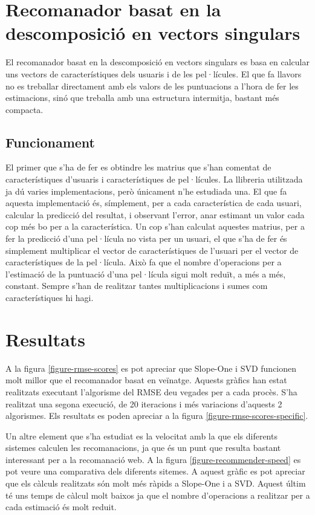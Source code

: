 \section{Recomanador basat en la descomposició en vectors singulars}

El recomanador basat en la descomposició en vectors singulars es basa en calcular uns vectors de característiques dels usuaris i de les pel·lícules. El que fa llavors no es treballar directament amb els valors de les puntuacions a l'hora de fer les estimacions, sinó que treballa amb una estructura intermitja, bastant més compacta.

\subsection{Funcionament}

El primer que s'ha de fer es obtindre les matrius que s'han comentat de característiques d'usuaris i característiques de pel·lícules. La llibreria utilitzada ja dú varies implementacions, però únicament n'he estudiada una. El que fa aquesta implementació és, símplement, per a cada característica de cada usuari, calcular la predicció del resultat, i observant l'error, anar estimant un valor cada cop més bo per a la característica. Un cop s'han calculat aquestes matrius, per a fer la predicció d'una pel·lícula no vista per un usuari, el que s'ha de fer és simplement multiplicar el vector de característiques de l'usuari per el vector de característiques de la pel·lícula. Això fa que el nombre d'operacions per a l'estimació de la puntuació d'una pel·lícula sigui molt reduït, a més a més, constant. Sempre s'han de realitzar tantes multiplicacions i sumes com característiques hi hagi.

\section{Resultats}

A la figura \ref{figure-rmse-scores} es pot apreciar que Slope-One i SVD funcionen molt millor que el recomanador basat en veïnatge. Aquests gràfics han estat realitzats executant l'algorisme del RMSE deu vegades per a cada procès. S'ha realitzat una segona execució, de 20 iteracions i més variacions d'aquests 2 algorismes. Els resultats es poden apreciar a la figura \ref{figure-rmse-scores-specific}.

Un altre element que s'ha estudiat es la velocitat amb la que els diferents sistemes calculen les recomanacions, ja que és un punt que resulta bastant interessant per a la recomanació web. A la figura \ref{figure-recommender-speed} es pot veure una comparativa dels diferents sitemes. A aquest gràfic es pot apreciar que els càlculs realitzats són molt més ràpids a Slope-One i a SVD. Aquest últim té uns temps de càlcul molt baixos ja que el nombre d'operacions a realitzar per a cada estimació és molt reduit.

